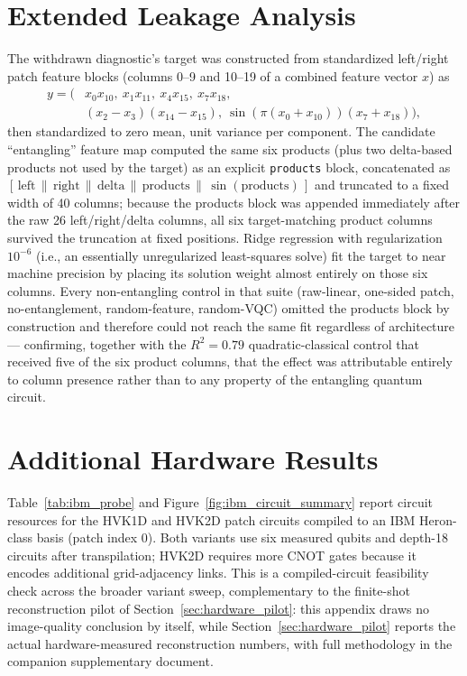 \documentclass[journal]{IEEEtran}
\begin{document}
\section{Extended Leakage Analysis}
\label{app:leakage}
The withdrawn diagnostic's target was constructed from standardized left/right patch feature blocks (columns 0--9 and 10--19 of a combined feature vector $x$) as
\begin{equation}
\begin{aligned}
y = \bigl(&x_{0}x_{10},\ x_{1}x_{11},\ x_{4}x_{15},\ x_{7}x_{18},\\
&(x_{2}{-}x_{3})(x_{14}{-}x_{15}),\ \sin(\pi(x_0{+}x_{10}))(x_7{+}x_{18})\bigr),
\end{aligned}
\end{equation}
then standardized to zero mean, unit variance per component. The candidate ``entangling'' feature map computed the same six products (plus two delta-based products not used by the target) as an explicit \texttt{products} block, concatenated as $[\,\mathrm{left}\,\|\,\mathrm{right}\,\|\,\mathrm{delta}\,\|\,\mathrm{products}\,\|\,\sin(\mathrm{products})\,]$ and truncated to a fixed width of 40 columns; because the products block was appended immediately after the raw 26 left/right/delta columns, all six target-matching product columns survived the truncation at fixed positions. Ridge regression with regularization $10^{-6}$ (i.e., an essentially unregularized least-squares solve) fit the target to near machine precision by placing its solution weight almost entirely on those six columns. Every non-entangling control in that suite (raw-linear, one-sided patch, no-entanglement, random-feature, random-VQC) omitted the products block by construction and therefore could not reach the same fit regardless of architecture --- confirming, together with the $R^2=0.79$ quadratic-classical control that received five of the six product columns, that the effect was attributable entirely to column presence rather than to any property of the entangling quantum circuit.

\section{Additional Hardware Results}
\label{app:hardware}
Table~\ref{tab:ibm_probe} and Figure~\ref{fig:ibm_circuit_summary} report circuit resources for the HVK1D and HVK2D patch circuits compiled to an IBM Heron-class basis (patch index $0$). Both variants use six measured qubits and depth-18 circuits after transpilation; HVK2D requires more CNOT gates because it encodes additional grid-adjacency links. This is a compiled-circuit feasibility check across the broader variant sweep, complementary to the finite-shot reconstruction pilot of Section~\ref{sec:hardware_pilot}: this appendix draws no image-quality conclusion by itself, while Section~\ref{sec:hardware_pilot} reports the actual hardware-measured reconstruction numbers, with full methodology in the companion supplementary document.
\end{document}
